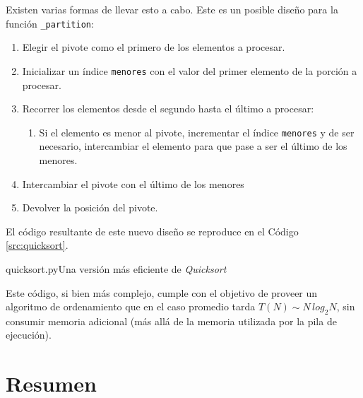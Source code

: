 Existen varias formas de llevar esto a cabo.  Este es un posible diseño
para la función \lstinline!_partition!:

\begin{enumerate}
\item Elegir el pivote como el primero de los elementos a procesar.
\item Inicializar un índice \lstinline!menores! con el valor del primer
elemento de la porción a procesar.
\item Recorrer los elementos desde el segundo hasta el último a procesar:
\begin{enumerate}
\item Si el elemento es menor al pivote, incrementar el índice
\lstinline!menores! y de ser necesario, intercambiar el elemento para que
pase a ser el último de los menores.
\end{enumerate}
\item Intercambiar el pivote con el último de los menores
\item Devolver la posición del pivote.
\end{enumerate}

El código resultante de este nuevo diseño se reproduce en el Código
\ref{src:quicksort}.

\begin{codigo}{quicksort.py}{Una versión más eficiente de {\it Quicksort}}

\label{src:quicksort}
\end{codigo}

Este código, si bien más complejo, cumple con el objetivo de proveer un
algoritmo de ordenamiento que en el caso promedio tarda
$T(N) \sim N \, log_2 N$, sin consumir memoria adicional (más allá de la
memoria utilizada por la pila de ejecución).

\section{Resumen}

